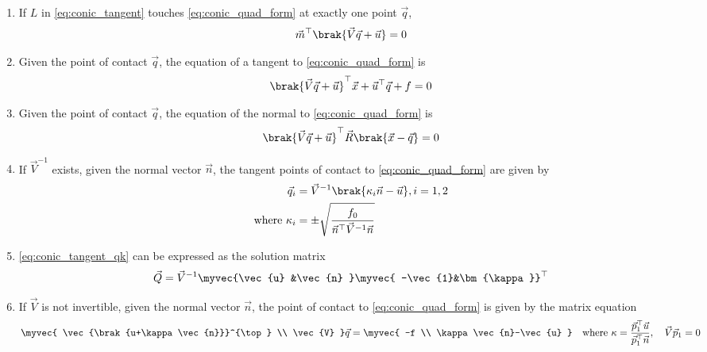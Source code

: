 \begin{enumerate}[label=\thesubsection.\arabic*,ref=\thesubsection.\theenumi]
\item
  If $L$ in \eqref{eq:conic_tangent} touches \eqref{eq:conic_quad_form} at exactly one point $\vec{q}$, 
  \begin{align}
  \vec{m}^{\top}\brak{\vec{V}\vec{q}+\vec{u}} = 0
  \label{eq:conic_tangent_mq}
  \end{align}
\item
  Given the point of contact $\vec{q}$, the equation of a tangent to \eqref{eq:conic_quad_form} is 
  \begin{align}
  \brak{\vec{V}\vec{q}+\vec{u}}^{\top}\vec{x}+\vec{u}^{\top}\vec{q}+f = 0
  \label{eq:conic_tangent_final}
  \end{align}
\item
  Given the point of contact $\vec{q}$, the equation of the normal to \eqref{eq:conic_quad_form} is 
  \begin{align}
    \brak{\vec{V}\vec{q}+\vec{u}}^{\top}\vec{R}\brak{\vec{x}-\vec{q}} =0
  \label{eq:conic_normal_final}
  \end{align}
\item
	\label{prop:conic-p-contact-nonparab}
  If $\vec{V}^{-1}$ exists, given the normal vector $\vec{n}$, the tangent points of contact to \eqref{eq:conic_quad_form} are given by
\begin{align}
  \begin{split}
\vec{q}_i &= \vec{V}^{-1}\brak{\kappa_i \vec{n}-\vec{u}}, i = 1,2
\\
\text{where }\kappa_i &= \pm \sqrt{
\frac{
f_0
}
{
\vec{n}^{\top}\vec{V}^{-1}\vec{n}
}
}
  \end{split}
\label{eq:conic_tangent_qk}
\end{align}
 \item 
\eqref{eq:conic_tangent_qk}
	can be expressed as the solution matrix
\begin{align}
	\vec{Q} =\vec{V}^{-1} \myvec{\vec{u} &\vec{n} }\myvec{ -\vec{1}&\bm{\kappa}}^\top
\label{eq:conic_tangent_Q}
\end{align}
\item
  If $\vec{V}$ is not invertible,  given the normal vector $\vec{n}$, the point of contact to \eqref{eq:conic_quad_form} is given by the matrix equation
\begin{align}
\label{eq:conic_tangent_q_eigen}
\myvec{
\vec{\brak{u+\kappa \vec{n}}}^{\top} \\ \vec{V}
}
\vec{q} = 
\myvec{
-f
\\
\kappa\vec{n}-\vec{u}
}
\quad 
\text{where }  \kappa = \frac{\vec{p}_1^{\top}\vec{u}}{\vec{p}_1^{\top}\vec{n}}, \quad \vec{V}\vec{p}_1 = 0
\end{align}


\end{enumerate}
